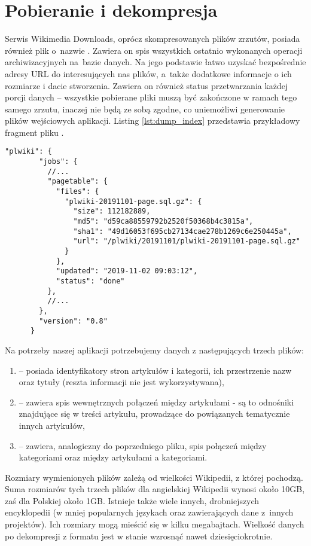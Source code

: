 \section{Pobieranie i dekompresja}
\label{sec:data-download}
Serwis Wikimedia Downloads, oprócz skompresowanych plików zrzutów, posiada również plik o~nazwie . Zawiera on spis wszystkich ostatnio wykonanych operacji archiwizacyjnych na~bazie danych. Na jego podstawie łatwo uzyskać bezpośrednie adresy URL do interesujących nas plików, a~także dodatkowe informacje o ich rozmiarze i dacie stworzenia. Zawiera on również status przetwarzania każdej porcji danych – wszystkie pobierane pliki muszą być zakończone w ramach tego samego zrzutu, inaczej nie będą ze sobą zgodne, co uniemożliwi generowanie plików wejściowych aplikacji. Listing \ref{lst:dump_index} przedstawia przykładowy fragment pliku .

\begin{lstlisting}[frame=single,caption={Fragment informacji o ostatnim zrzucie bazy danych polskiej Wikipedii},label=lst:dump_index]
    "plwiki": {
        "jobs": {
          //...
          "pagetable": {
            "files": {
              "plwiki-20191101-page.sql.gz": {
                "size": 112182889,
                "md5": "d59ca88559792b2520f50368b4c3815a",
                "sha1": "49d16053f695cb27134cae278b1269c6e250445a",
                "url": "/plwiki/20191101/plwiki-20191101-page.sql.gz"
              }
            },
            "updated": "2019-11-02 09:03:12",
            "status": "done"
          },
          //...
        },
        "version": "0.8"
      }      
\end{lstlisting}

Na potrzeby naszej aplikacji potrzebujemy danych z następujących trzech plików:

\begin{enumerate}[label=\textbullet]
    \item {} – posiada identyfikatory stron artykułów i kategorii, ich przestrzenie nazw oraz tytuły (reszta informacji nie jest wykorzystywana),
    \item {} – zawiera spis wewnętrznych połączeń między artykułami - są to odnośniki znajdujące się w treści artykułu, prowadzące do powiązanych tematycznie innych artykułów,
    \item {} – zawiera, analogiczny do poprzedniego pliku, spis połączeń między kategoriami oraz między artykułami a kategoriami.
\end{enumerate}

Rozmiary wymienionych plików zależą od wielkości Wikipedii, z której pochodzą. Suma rozmiarów tych trzech plików dla angielskiej Wikipedii wynosi około 10GB, zaś dla Polskiej około 1GB. Istnieje także wiele innych, drobniejszych encyklopedii (w mniej popularnych językach oraz zawierających dane z~innych projektów). Ich rozmiary mogą mieścić się w kilku megabajtach. Wielkość danych po dekompresji z formatu  jest w stanie wzrosnąć nawet dziesięciokrotnie.
\newpage
